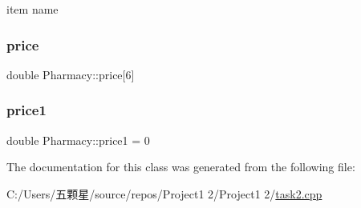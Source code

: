 item name \mbox{\label{class_pharmacy_a18d9bdfcb9c03a5f5b752d6f2abc6116}} 
\subsubsection{\texorpdfstring{price}{price}}
{\footnotesize\ttfamily double Pharmacy\+::price\mbox{[}6\mbox{]}\hspace{0.3cm}{\ttfamily [private]}}

\mbox{\label{class_pharmacy_a1be725848c7917118634c633d5986b0c}} 
\subsubsection{\texorpdfstring{price1}{price1}}
{\footnotesize\ttfamily double Pharmacy\+::price1 = 0\hspace{0.3cm}{\ttfamily [private]}}



The documentation for this class was generated from the following file\+:\begin{DoxyCompactItemize}
\item 
C\+:/\+Users/五颗星/source/repos/\+Project1 2/\+Project1 2/\mbox{\hyperlink{task2_8cpp}{task2.\+cpp}}\end{DoxyCompactItemize}
